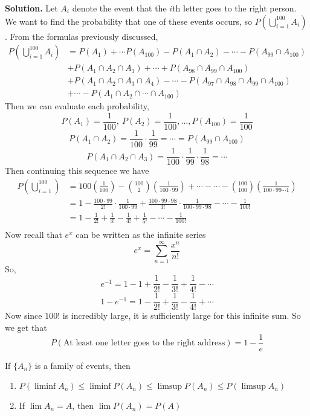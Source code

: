 \documentclass[openany]{report}
\begin{document}
\textbf{Solution.} Let $A_i$ denote the event that the $i$th letter goes to the right person. We want to find the probability that one of these events occurs, so $P\left(\bigcup\limits_{i=1}^{100} A_i\right)$. From the formulas previously discussed, 
\begin{align*}
    P\left(\bigcup_{i=1}^{100} A_i\right) &= P(A_1) + \cdots P(A_100) - P(A_1 \cap A_2) - \cdots - P(A_{99} \cap A_{100})\\
    &+ P(A_1 \cap A_2 \cap A_3) + \cdots + P(A_{98} \cap A_{99} \cap A_{100})\\
    &+ P(A_1 \cap A_2 \cap A_3 \cap A_4) - \cdots - P(A_{97} \cap A_{98} \cap A_{99} \cap A_{100})\\
    &+ \cdots - P(A_1 \cap A_2 \cap \cdots \cap A_{100})
\end{align*}
Then we can evaluate each probability, 
\[P(A_1) = \frac{1}{100}, \ P(A_2) = \frac{1}{100}, \ldots, P(A_{100}) = \frac{1}{100}\]
\[P(A_1 \cap A_2) = \frac{1}{100} \cdot \frac{1}{99} = \cdots = P(A_{99} \cap A_{100})\]
\[P(A_1 \cap A_2 \cap A_3) = \frac{1}{100} \cdot \frac{1}{99} \cdot \frac{1}{98} = \cdots\]
Then continuing this sequence we have
\begin{align*}
    P\left(\bigcup_{i=1}^{100}\right) &= 100\left(\frac{1}{100}\right) - {100 \choose 2}\left(\frac{1}{100\cdot99}\right)+ \cdots - \cdots - {100 \choose 100}\left(\frac{1}{100 \cdot 99 \cdots 1}\right)\\
    &= 1 - \frac{100 \cdot 99}{2!} \cdot \frac{1}{100 \cdot 99} + \frac{100 \cdot 99 \cdot 98}{3!}\cdot\frac{1}{100 \cdot 99 \cdot 98} - \cdots - \frac{1}{100!}\\
    &= 1 - \frac{1}{2!} + \frac{1}{3!} - \frac{1}{4!} + \frac{1}{5!} - \cdots - \frac{1}{100!}\\ 
\end{align*}
Now recall that $e^x$ can be written as the infinite series 
\[e^x = \sum_{n=1}^\infty \frac{x^n}{n!}\]
So, 
\[e^{-1} = 1 - 1 + \frac{1}{2!} - \frac{1}{3!} + \frac{1}{4!} - \cdots\]
\[1 - e^{-1} = 1 - \frac{1}{2!} + \frac{1}{3!} - \frac{1}{4!} + \cdots\]
Now since $100!$ is incredibly large, it is sufficiently large for this infinite sum. So we get that 
\[P(\text{At least one letter goes to the right address}) = 1 - \frac{1}{e}\]
\begin{lemma}
    If $\{A_n\}$ is a family of events, then 
    \begin{enumerate}
        \item $P(\liminf A_n) \leq \liminf P(A_n) \leq \limsup P(A_n) \leq P(\limsup A_n)$
        \item If $\lim A_n = A$, then $\lim P(A_n) = P(A)$
    \end{enumerate}
\end{lemma}
\end{document}
